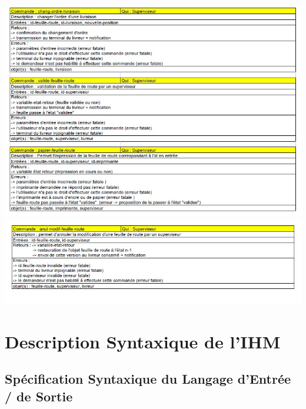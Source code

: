 \documentclass{report}
\begin{document}
\includegraphics[scale = 0.7]{images/DCOM6.jpg}\\
\includegraphics[scale = 0.7]{images/DCOM7.jpg}\\



\chapter{Description Syntaxique de l'IHM}


\section{Spécification Syntaxique du Langage d'Entrée / de Sortie}
\end{document}
